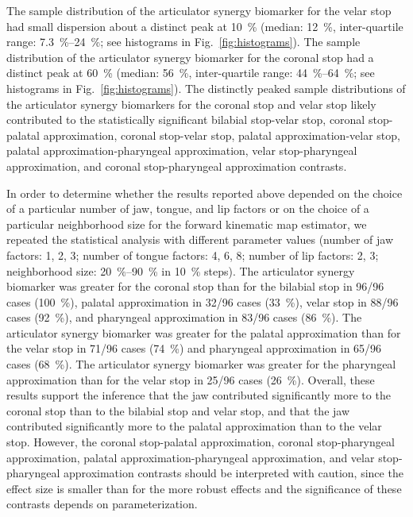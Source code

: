 \documentclass[preprint]{JASAnew}\usepackage[]{graphicx}\usepackage[]{color}
\begin{document}
The sample distribution of the articulator synergy biomarker for the velar stop had small dispersion about a distinct peak at \SI{10}{\percent} 
%
(median: \SI{12}{\percent}, 
inter-quartile range: \SIrange{7.3}{24}{\percent}; see histograms in Fig.~\ref{fig:histograms}).
%
The sample distribution of the articulator synergy biomarker for the coronal stop had a distinct peak at \SI{60}{\percent}
%
(median: \SI{56}{\percent}, 
inter-quartile range: \SIrange{44}{64}{\percent}; see histograms in Fig.~\ref{fig:histograms}).
%
The distinctly peaked sample distributions of the articulator synergy biomarkers for the coronal stop and velar stop likely contributed to the statistically significant bilabial stop-velar stop, coronal stop-palatal approximation, coronal stop-velar stop, palatal approximation-velar stop, palatal approximation-pharyngeal approximation, velar stop-pharyngeal approximation, and coronal stop-pharyngeal approximation contrasts.



In order to determine whether the results reported above depended on the choice of a particular number of jaw, tongue, and lip factors or on the choice of a particular neighborhood size for the forward kinematic map estimator, we repeated the statistical analysis with different parameter values (number of jaw factors: 1, 2, 3; number of tongue factors: 4, 6, 8; number of lip factors: 2, 3; neighborhood size: \SIrange{20}{90}{\percent} in \SI{10}{\percent} steps).
%
The articulator synergy biomarker was greater for the coronal stop than for the 
%
bilabial stop in 96/96 cases 
(\SI{100}{\percent}), 
%
palatal approximation in 32/96 cases
(\SI{33}{\percent}), 
velar stop in 88/96 cases 
(\SI{92}{\percent}), 
and pharyngeal approximation in 83/96 cases
(\SI{86}{\percent}).
%
The articulator synergy biomarker was greater for the palatal approximation than for the 
%
velar stop in 71/96 cases
(\SI{74}{\percent})
and pharyngeal approximation in 65/96 cases
(\SI{68}{\percent}).
%
The articulator synergy biomarker was greater for the pharyngeal approximation than for the 
%
velar stop in 25/96 cases 
(\SI{26}{\percent}).
%
Overall, these results support the inference that the jaw contributed significantly more to the coronal stop than to the bilabial stop and velar stop,
%
and that the jaw contributed significantly more to the palatal approximation than to the velar stop.
%
However, the coronal stop-palatal approximation, coronal stop-pharyngeal approximation, palatal approximation-pharyngeal approximation, and velar stop-pharyngeal approximation contrasts should be interpreted with caution, since the effect size is smaller than for the more robust effects and the significance of these contrasts depends on parameterization.
\end{document}
